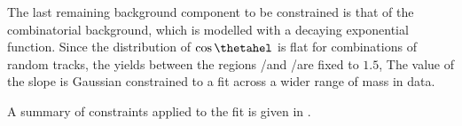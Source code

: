 

The last remaining background component to be constrained is that of the combinatorial background,
which is modelled with a decaying exponential function.
Since the distribution of $\cos\thetahel$ is flat for combinations of random tracks, the yields
between the regions \rA/\rC and \rB/\rD  are fixed to $1.5$,
The value of the slope is Gaussian constrained to a fit across a wider range of mass in data.

A summary of constraints applied to the fit is given in .

